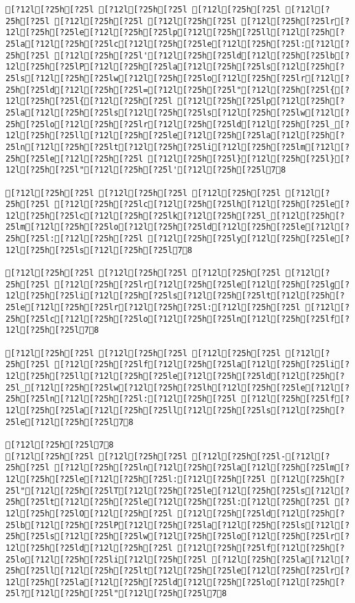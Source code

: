 \documentclass{scrartcl}
\begin{document}
\begin{Verbatim}
[?12l[?25h[?25l [?12l[?25h[?25l [?12l[?25h[?25l [?12l[?25h[?25l [?12l[?25h[?25l [?12l[?25h[?25l [?12l[?25h[?25lr[?12l[?25h[?25le[?12l[?25h[?25lp[?12l[?25h[?25ll[?12l[?25h[?25la[?12l[?25h[?25lc[?12l[?25h[?25le[?12l[?25h[?25l:[?12l[?25h[?25l [?12l[?25h[?25l'[?12l[?25h[?25ld[?12l[?25h[?25lb[?12l[?25h[?25lP[?12l[?25h[?25la[?12l[?25h[?25ls[?12l[?25h[?25ls[?12l[?25h[?25lw[?12l[?25h[?25lo[?12l[?25h[?25lr[?12l[?25h[?25ld[?12l[?25h[?25l=[?12l[?25h[?25l"[?12l[?25h[?25l{[?12l[?25h[?25l{[?12l[?25h[?25l [?12l[?25h[?25lp[?12l[?25h[?25la[?12l[?25h[?25ls[?12l[?25h[?25ls[?12l[?25h[?25lw[?12l[?25h[?25lo[?12l[?25h[?25lr[?12l[?25h[?25ld[?12l[?25h[?25l_[?12l[?25h[?25ll[?12l[?25h[?25le[?12l[?25h[?25la[?12l[?25h[?25ln[?12l[?25h[?25lt[?12l[?25h[?25li[?12l[?25h[?25lm[?12l[?25h[?25le[?12l[?25h[?25l [?12l[?25h[?25l}[?12l[?25h[?25l}[?12l[?25h[?25l"[?12l[?25h[?25l'[?12l[?25h[?25l78

[?12l[?25h[?25l [?12l[?25h[?25l [?12l[?25h[?25l [?12l[?25h[?25l [?12l[?25h[?25lc[?12l[?25h[?25lh[?12l[?25h[?25le[?12l[?25h[?25lc[?12l[?25h[?25lk[?12l[?25h[?25l_[?12l[?25h[?25lm[?12l[?25h[?25lo[?12l[?25h[?25ld[?12l[?25h[?25le[?12l[?25h[?25l:[?12l[?25h[?25l [?12l[?25h[?25ly[?12l[?25h[?25le[?12l[?25h[?25ls[?12l[?25h[?25l78

[?12l[?25h[?25l [?12l[?25h[?25l [?12l[?25h[?25l [?12l[?25h[?25l [?12l[?25h[?25lr[?12l[?25h[?25le[?12l[?25h[?25lg[?12l[?25h[?25li[?12l[?25h[?25ls[?12l[?25h[?25lt[?12l[?25h[?25le[?12l[?25h[?25lr[?12l[?25h[?25l:[?12l[?25h[?25l [?12l[?25h[?25lc[?12l[?25h[?25lo[?12l[?25h[?25ln[?12l[?25h[?25lf[?12l[?25h[?25l78

[?12l[?25h[?25l [?12l[?25h[?25l [?12l[?25h[?25l [?12l[?25h[?25l [?12l[?25h[?25lf[?12l[?25h[?25la[?12l[?25h[?25li[?12l[?25h[?25ll[?12l[?25h[?25le[?12l[?25h[?25ld[?12l[?25h[?25l_[?12l[?25h[?25lw[?12l[?25h[?25lh[?12l[?25h[?25le[?12l[?25h[?25ln[?12l[?25h[?25l:[?12l[?25h[?25l [?12l[?25h[?25lf[?12l[?25h[?25la[?12l[?25h[?25ll[?12l[?25h[?25ls[?12l[?25h[?25le[?12l[?25h[?25l78

[?12l[?25h[?25l78
[?12l[?25h[?25l [?12l[?25h[?25l [?12l[?25h[?25l-[?12l[?25h[?25l [?12l[?25h[?25ln[?12l[?25h[?25la[?12l[?25h[?25lm[?12l[?25h[?25le[?12l[?25h[?25l:[?12l[?25h[?25l [?12l[?25h[?25l"[?12l[?25h[?25lT[?12l[?25h[?25le[?12l[?25h[?25ls[?12l[?25h[?25lt[?12l[?25h[?25le[?12l[?25h[?25l:[?12l[?25h[?25l [?12l[?25h[?25lO[?12l[?25h[?25l [?12l[?25h[?25ld[?12l[?25h[?25lb[?12l[?25h[?25lP[?12l[?25h[?25la[?12l[?25h[?25ls[?12l[?25h[?25ls[?12l[?25h[?25lw[?12l[?25h[?25lo[?12l[?25h[?25lr[?12l[?25h[?25ld[?12l[?25h[?25l [?12l[?25h[?25lf[?12l[?25h[?25lo[?12l[?25h[?25li[?12l[?25h[?25l [?12l[?25h[?25la[?12l[?25h[?25ll[?12l[?25h[?25lt[?12l[?25h[?25le[?12l[?25h[?25lr[?12l[?25h[?25la[?12l[?25h[?25ld[?12l[?25h[?25lo[?12l[?25h[?25l?[?12l[?25h[?25l"[?12l[?25h[?25l78


\end{Verbatim}
\end{document}
